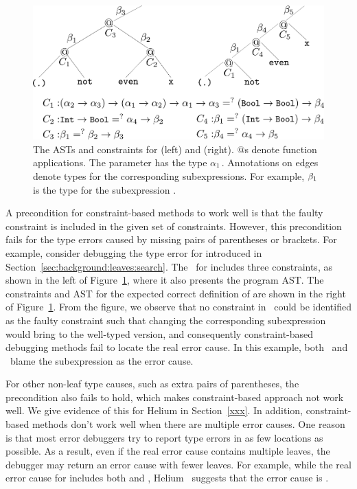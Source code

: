 \documentclass[12pt]{report}	%
\begin{document}
\begin{figure}[t]
\centering
\includegraphics[width=0.85\columnwidth]{images/nonstruc.pdf}
\caption{The ASTs and constraints for  (left)
and  (right).
\ensuremath{@}s denote function applications.
The parameter  has the type $\alpha_1$.
Annotations on edges denote types for the corresponding
subexpressions. For example, $\beta_1$ is the type for the
subexpression .}
\label{fig:nonstruc}
\end{figure}

A precondition for
constraint-based methods to work well is that the
faulty constraint is included in the given set of
constraints. However, this precondition fails
for the type errors caused by missing pairs of parentheses
or brackets.
For example,
consider debugging the type error for 
introduced in Section~\ref{sec:background:leaves:search}.
The \cs\ for  includes three constraints,
as shown in the left of Figure~\ref{fig:nonstruc}, where it
also presents the program AST. The constraints and AST for the
expected correct definition of  are shown in
the right of Figure~\ref{fig:nonstruc}. From the figure,
we observe that no constraint in \cs\ could be identified
as the faulty constraint such that changing the corresponding
subexpression would bring  to the
well-typed version, and consequently constraint-based debugging
methods fail to locate the real error cause. In this example,
both \toolH\ and \toolS\ blame the subexpression 
as the error cause.

%
For other non-leaf type causes, such as extra pairs
of parentheses, the precondition also fails to hold,
which makes constraint-based approach not work well.
We give evidence of this
for Helium in Section~\ref{xxx}.
%
In addition, constraint-based methods don't work well when there are
multiple error causes. One reason is that most
error debuggers try to report type errors in as few locations
as possible. As a result, even if the real error cause contains
multiple leaves, the debugger may return an error cause with
fewer leaves. For example, while the real error cause for
 includes both \prog{(<)} and ,
Helium~\cite{Heeren05:TQT} suggests that the error cause
is .
\end{document}
